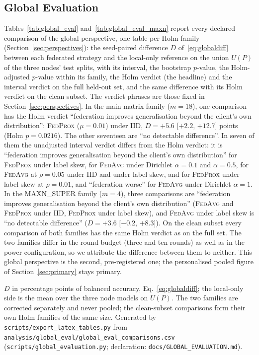 \documentclass[journal]{IEEEtran}
\newcommand{\fedavg}{\textsc{FedAvg}}
\newcommand{\fedprox}{\textsc{FedProx}}
\begin{document}
\subsection{Global Evaluation}
\label{sec:res_global}

Tables~\ref{tab:global_eval} and~\ref{tab:global_eval_maxn} report every declared comparison of the global perspective, one table per Holm family (Section~\ref{sec:perspectives}): the seed-paired difference $D$ of~\eqref{eq:globaldiff} between each federated strategy and the local-only reference on the union $U(P)$ of the three nodes' test splits, with its interval, the bootstrap $p$-value, the Holm-adjusted $p$-value within its family, the Holm verdict (the headline) and the interval verdict on the full held-out set, and the same difference with its Holm verdict on the clean subset. The verdict phrases are those fixed in Section~\ref{sec:perspectives}. In the main-matrix family ($m=18$), one comparison has the Holm verdict ``federation improves generalisation beyond the client's own distribution'': \fedprox{} ($\mu=0.01$) under IID, $D=+5.6$ [$+2.2$, $+12.7$] points (Holm $p=0.0216$). The other seventeen are ``no detectable difference''. In seven of them the unadjusted interval verdict differs from the Holm verdict: it is ``federation improves generalisation beyond the client's own distribution'' for \fedprox{} under label skew, for \fedavg{} under Dirichlet $\alpha=0.1$ and $\alpha=0.5$, for \fedavg{} at $\rho=0.05$ under IID and under label skew, and for \fedprox{} under label skew at $\rho=0.01$, and ``federation worse'' for \fedavg{} under Dirichlet $\alpha=1$. In the MAXN\_SUPER family ($m=4$), three comparisons are ``federation improves generalisation beyond the client's own distribution'' (\fedavg{} and \fedprox{} under IID, \fedprox{} under label skew), and \fedavg{} under label skew is ``no detectable difference'' ($D=+3.6$ [$-0.2$, $+8.3$]). On the clean subset every comparison of both families has the same Holm verdict as on the full set. The two families differ in the round budget (three and ten rounds) as well as in the power configuration, so we attribute the difference between them to neither. This global perspective is the second, pre-registered one; the personalised pooled figure of Section~\ref{sec:primary} stays primary.

\begin{table}[t]
\centering
\caption{Global Evaluation: Federated Strategy Minus Local-Only Reference on the Union of the Test Splits (Balanced Accuracy, Seed-Paired, Sequence Bootstrap $B=10{,}000$)}
\label{tab:global_eval}
\setlength{\tabcolsep}{2pt}
{\footnotesize
}
\vspace{2pt}
\parbox{\textwidth}{\footnotesize $D$ in percentage points of balanced accuracy, Eq.~\eqref{eq:globaldiff}; the local-only side is the mean over the three node models on $U(P)$. The two families are corrected separately and never pooled; the clean-subset comparisons form their own Holm families of the same size. Generated by \texttt{scripts/export\_latex\_tables.py} from \texttt{analysis/global\_eval/global\_eval\_comparisons.csv} (\texttt{scripts/global\_evaluation.py}; declaration: \texttt{docs/GLOBAL\_EVALUATION.md}).}
\end{table}
\end{document}
